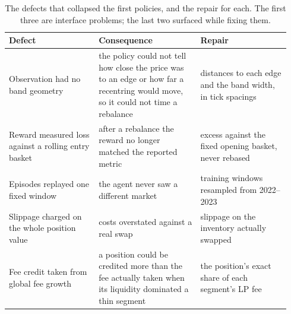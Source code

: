 \begin{table}[tbp]
\caption{The defects that collapsed the first policies, and the repair for
each. The first three are interface problems; the last two surfaced while
fixing them.}
\label{tab:repairs}
\centering
\small
\begin{tabular}{@{}L{0.30\linewidth}L{0.34\linewidth}L{0.30\linewidth}@{}}
\toprule
\textbf{Defect} & \textbf{Consequence} & \textbf{Repair} \\
\midrule
Observation had no band geometry &
the policy could not tell how close the price was to an edge or how far a recentring would move, so it could not time a rebalance &
distances to each edge and the band width, in tick spacings \\
Reward measured loss against a rolling entry basket &
after a rebalance the reward no longer matched the reported metric &
excess against the fixed opening basket, never rebased \\
Episodes replayed one fixed window &
the agent never saw a different market &
training windows resampled from 2022--2023 \\
Slippage charged on the whole position value &
costs overstated against a real swap &
slippage on the inventory actually swapped \\
Fee credit taken from global fee growth &
a position could be credited more than the fee actually taken when its liquidity dominated a thin segment &
the position's exact share of each segment's LP fee \\
\bottomrule
\end{tabular}
\end{table}
